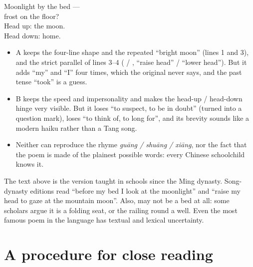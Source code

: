 \begin{example}
Moonlight by the bed ---\\
frost on the floor?\\
Head up: the moon.\\
Head down: home.
\end{example}

\begin{important}
\begin{itemize}
  \item A keeps the four-line shape and the repeated  ``bright moon'' (lines 1
        and 3), and the strict parallel of lines 3--4 ( / , ``raise
        head'' / ``lower head''). But it adds ``my'' and ``I'' four times, which the
        original never says, and the past tense ``took'' is a guess.
  \item B keeps the speed and impersonality and makes the head-up / head-down hinge very
        visible. But it loses  ``to suspect, to be in doubt'' (turned into a
        question mark), loses  ``to think of, to long for'', and its brevity
        sounds like a modern haiku rather than a Tang song.
  \item Neither can reproduce the rhyme \emph{guāng / shuāng / xiāng}, nor the fact that
        the poem is made of the plainest possible words: every Chinese schoolchild knows
        it.
\end{itemize}
\end{important}

\begin{aside}
The text above is the version taught in schools since the Ming dynasty. Song-dynasty
editions read  ``before my bed I look at the moonlight'' and 
``raise my head to gaze at the mountain moon''. Also,  may not be a bed at all:
some scholars argue it is a folding seat, or the railing round a well. Even the most famous
poem in the language has textual and lexical uncertainty.
\end{aside}

\section{A procedure for close reading}

